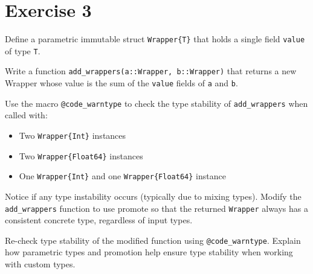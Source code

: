 \documentclass{article}
\begin{document}
\section*{Exercise 3}

Define a parametric immutable struct \texttt{Wrapper\{T\}} that holds a single field \texttt{value} of type \texttt{T}.

\noindent
Write a function \texttt{add\_wrappers(a::Wrapper, b::Wrapper)} that returns a new Wrapper whose value is the sum of the \texttt{value} fields of \texttt{a} and \texttt{b}.

\noindent
Use the macro \texttt{@code\_warntype} to check the type stability of \texttt{add\_wrappers} when called with:

\begin{itemize}
    \item Two \texttt{Wrapper\{Int\}} instances

    \item Two \texttt{Wrapper\{Float64\}} instances

    \item One \texttt{Wrapper\{Int\}} and one \texttt{Wrapper\{Float64\}} instance
\end{itemize}

\noindent
Notice if any type instability occurs (typically due to mixing types). Modify the \texttt{add\_wrappers} function to use promote so that the returned \texttt{Wrapper} always has a consistent concrete type, regardless of input types. 

\noindent
Re-check type stability of the modified function using \texttt{@code\_warntype}. Explain how parametric types and promotion help ensure type stability when working with custom types.
\end{document}
